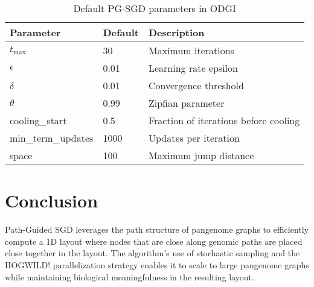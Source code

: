 \documentclass{article}
\begin{document}
\begin{table}[h]
\centering
\begin{tabular}{|l|l|l|}
\hline
\textbf{Parameter} & \textbf{Default} & \textbf{Description} \\
\hline
$t_{\max}$ & 30 & Maximum iterations \\
$\epsilon$ & 0.01 & Learning rate epsilon \\
$\delta$ & 0.01 & Convergence threshold \\
$\theta$ & 0.99 & Zipfian parameter \\
cooling\_start & 0.5 & Fraction of iterations before cooling \\
min\_term\_updates & 1000 & Updates per iteration \\
space & 100 & Maximum jump distance \\
\hline
\end{tabular}
\caption{Default PG-SGD parameters in ODGI}
\end{table}

\section{Conclusion}

Path-Guided SGD leverages the path structure of pangenome graphs to efficiently compute a 1D layout where nodes that are close along genomic paths are placed close together in the layout. The algorithm's use of stochastic sampling and the HOGWILD! parallelization strategy enables it to scale to large pangenome graphs while maintaining biological meaningfulness in the resulting layout.
\end{document}
